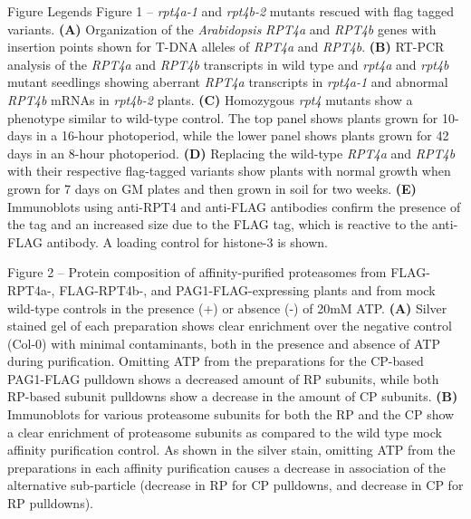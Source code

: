 \begin{singlespace}

\renewcommand\bibname{Literature Cited}

\end{singlespace}



Figure Legends
Figure 1 – \textit{rpt4a-1} and \textit{rpt4b-2} mutants rescued with flag tagged variants. \textbf{(A)} Organization of the \textit{Arabidopsis} \textit{RPT4a} and \textit{RPT4b} genes with insertion points shown for T-DNA alleles of \textit{RPT4a} and \textit{RPT4b}. \textbf{(B)} RT-PCR analysis of the \textit{RPT4a} and \textit{RPT4b} transcripts in wild type and \textit{rpt4a} and \textit{rpt4b} mutant seedlings showing aberrant \textit{RPT4a} transcripts in \textit{rpt4a-1} and abnormal \textit{RPT4b} mRNAs in \textit{rpt4b-2} plants. \textbf{(C)} Homozygous \textit{rpt4} mutants show a phenotype similar to wild-type control. The top panel shows plants grown for 10-days in a 16-hour photoperiod, while the lower panel shows plants grown for 42 days in an 8-hour photoperiod. \textbf{(D)} Replacing the wild-type \textit{RPT4a} and \textit{RPT4b} with their respective flag-tagged variants show plants with normal growth when grown for 7 days on GM plates and then grown in soil for two weeks. \textbf{(E)} Immunoblots using anti-RPT4 and anti-FLAG antibodies confirm the presence of the tag and an increased size due to the FLAG tag, which is reactive to the anti-FLAG antibody. A loading control for histone-3 is shown.

Figure 2 – Protein composition of affinity-purified proteasomes from FLAG-RPT4a-, FLAG-RPT4b-, and PAG1-FLAG-expressing plants and from mock wild-type controls in the presence (+) or absence (-) of 20mM ATP. \textbf{(A)} Silver stained gel of each preparation shows clear enrichment over the negative control (Col-0) with minimal contaminants, both in the presence and absence of ATP during purification. Omitting ATP from the preparations for the CP-based PAG1-FLAG pulldown shows a decreased amount of RP subunits, while both RP-based subunit pulldowns show a decrease in the amount of CP subunits. \textbf{(B)} Immunoblots for various proteasome subunits for both the RP and the CP show a clear enrichment of proteasome subunits as compared to the wild type mock affinity purification control.  As shown in the silver stain, omitting ATP from the preparations in each affinity purification causes a decrease in association of the alternative sub-particle (decrease in RP for CP pulldowns, and decrease in CP for RP pulldowns).

